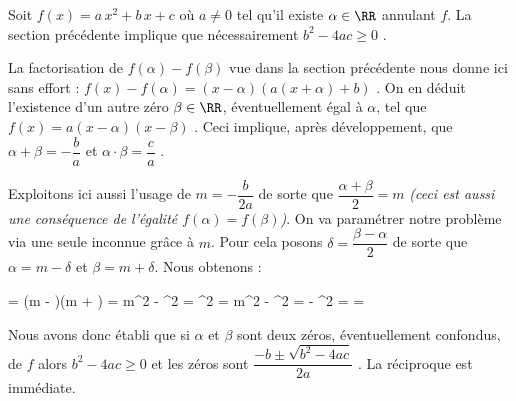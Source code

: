 Soit $f(x) = a \, x^2 + b \, x + c$ où $a \neq 0$ tel qu'il existe $\alpha \in \RR$ annulant $f$.
La section précédente implique que nécessairement $b^2 - 4 ac \geq 0$ .

\medskip

La factorisation de $f(\alpha) - f(\beta)$ vue dans la section précédente nous donne ici sans effort : 
$f(x) - f(\alpha) = (x - \alpha) (a (x + \alpha) + b)$ .
On en déduit l'existence d'un autre zéro $\beta \in \RR$, éventuellement égal à $\alpha$, tel que
$f(x) = a (x - \alpha) (x - \beta)$ .
Ceci implique, après développement, que
$\alpha   +   \beta = - \dfrac{b}{a}$
et
$\alpha \cdot \beta = \dfrac{c}{a}$ .


\medskip

Exploitons ici aussi l'usage de $m = - \dfrac{b}{2a}$ de sorte que
$\dfrac{\alpha + \beta}{2} = m$
\emph{(ceci est aussi une conséquence de l'égalité $f(\alpha) = f(\beta)$)}.
On va paramétrer notre problème via une seule inconnue grâce à $m$.
Pour cela posons
$\delta = \dfrac{\beta - \alpha}{2}$ de sorte que
$\alpha = m - \delta$ et $\beta = m + \delta$.
Nous obtenons :

\medskip

\begin{explain}[style = sar, ope = \iff]
	\alpha \cdot \beta = 
		\explnext{}
	(m - \delta)(m + \delta) = 
		\explnext{}
	m^2 - \delta^2 = 
		\explnext{}
	\delta^2 = m^2 - 
		\explnext{}
	\delta^2 =  - 
		\explnext{}
	\delta^2 = 
	\delta = \pm {}
\end{explain}

\medskip

Nous avons donc établi que si $\alpha$ et $\beta$ sont deux zéros, éventuellement confondus, de $f$ alors $b^2 - 4 ac \geq 0$ et les zéros sont $\dfrac{-b \pm \sqrt{b^2 - 4 ac}}{2 a}$ .
La réciproque est immédiate.
